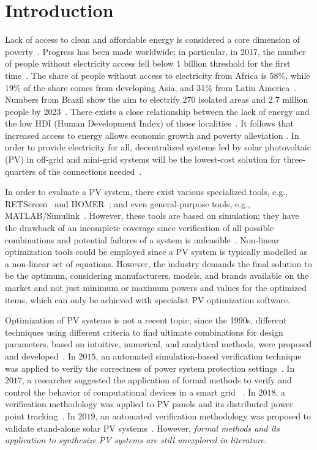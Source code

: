 \documentclass[runningheads]{llncs}
\begin{document}
\section{Introduction}
Lack of access to clean and affordable energy is considered a core dimension of poverty~\cite{Hussein2012}. Progress has been made worldwide; in particular, in 2017, the number of people without electricity access fell below $1$ billion threshold for the first time~\cite{IEAweo2018}. The share of people without access to electricity from Africa is 58\%, while 19\% of the share comes from developing Asia, and 31\% from Latin America~\cite{IEAweo2018}. Numbers from Brazil show the aim to electrify 270 isolated areas and 2.7 million people by 2023~\cite{EPE2018}. 
There exists a close relationship between the lack of energy and the low HDI (Human Development Index) of those localities~\cite{Coelho}. It follows that increased access to energy allows economic growth and poverty alleviation \cite{Karekesi}. In order to provide electricity for all, decentralized systems led by solar photovoltaic (PV) in off-grid and mini-grid systems will be the lowest-cost solution for three-quarters of the connections needed~\cite{Hussein2012}. 

In order to evaluate a PV system, there exist various specialized tools, e.g., RETScreen~\cite{Pradhan} and HOMER~\cite{Swarnkar}; and even general-purpose tools, e.g., MATLAB/Simulink~\cite{Gow1999}. However, these tools are based on simulation; they have the drawback of an incomplete coverage since verification of all possible combinations and potential failures of a system is unfeasible~\cite{ClarkeHV18}. Non-linear optimization tools could be employed since a PV system is typically modelled as a non-linear set of equations. However, the industry demands the final solution to be the optimum, considering manufacturers, models, and brands available on the market and not just minimum or maximum powers and values for the optimized items, which can only be achieved with specialist PV optimization software.

Optimization of PV systems is not a recent topic; since the 1990s, different techniques using different criteria to find ultimate combinations for design parameters, based on intuitive, numerical, and analytical methods, were proposed and developed~\cite{Alsadi2018}. In $2015$, an automated simulation-based verification technique was applied to verify the correctness of power system protection settings~\cite{Sengupta2015}. In $2017$, a researcher suggested the application of formal methods to verify and control the behavior of computational devices in a smart grid ~\cite{Abate2017}. In $2018$, a verification methodology was applied to PV panels and its distributed power point tracking~\cite{Driouich2018}. In $2019$, an automated verification methodology was proposed to validate stand-alone solar PV systems~\cite{TrindadeCordeiro19}. However, \textit{formal methods and its application to synthesize PV systems are still unexplored in literature}.
\end{document}
